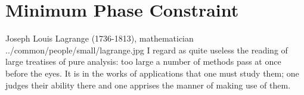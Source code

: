 
\chapter{Minimum Phase Constraint}
\label{chp:compactp}


\qboxnpq
  {
    Joseph Louis Lagrange (1736-1813), mathematician
    \footnotemark
  }
  {../common/people/small/lagrange.jpg}
  {I regard as quite useless the reading of large treatises of pure analysis:
    too large a number of methods pass at once before the eyes.
    It is in the works of applications that one must study them;
    one judges their ability there and one apprises the manner of making use of them.}

